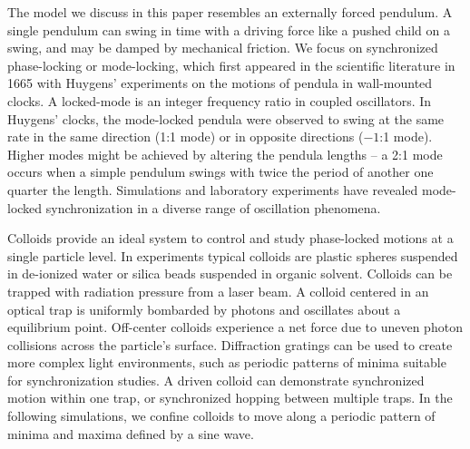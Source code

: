 \documentclass[preprint,showpacs,preprintnumbers,amsmath,amssymb,aps,prb]{revtex4-1}
\theoremstyle{remark}
\begin{document}
The model we discuss
in this paper 
resembles an externally forced pendulum.
A single pendulum 
can swing in time with a %
driving force
like  %
a pushed child on a swing,
and may be damped
by mechanical friction.
We focus on 
synchronized phase-locking or mode-locking,
which 
first appeared in the scientific literature
in 1665 with 
Huygens'  experiments on the
motions of %
pendula in wall-mounted clocks.\cite{Bennett2002}
A locked-mode is an integer frequency ratio
in coupled oscillators. %
In Huygens' clocks,
the mode-locked pendula were observed to swing at the same rate
in the same direction (1:1 mode) or in
opposite directions ($-1$:1 mode).
Higher modes might be achieved
by altering the pendula lengths --
a 2:1 mode occurs when a simple pendulum
swings with twice the period
of another one quarter the length.
Simulations and laboratory experiments
have revealed 
mode-locked synchronization
in a diverse range of 
oscillation phenomena.


Colloids 
provide an ideal system to 
control and study
phase-locked motions
at a single particle level.\cite{Juniper2015,Juniper2017}
In experiments %
typical colloids are   
plastic spheres suspended in
de-ionized water or silica beads suspended in organic solvent.
Colloids can be trapped
with 
radiation pressure from 
a laser beam.\cite{Ashkin1997} 
A colloid centered in an optical trap is 
uniformly bombarded by photons
and oscillates
about a equilibrium point.
Off-center colloids 
experience a net force
due to uneven photon collisions across
the particle's surface.
Diffraction gratings can be used to create
more complex light environments, 
such as periodic patterns of minima
suitable for synchronization studies.\cite{Grier2003}  
A driven colloid
can demonstrate
synchronized
motion within one trap,
or synchronized hopping between multiple traps.
In the following simulations, we confine colloids  
to move along a periodic pattern of 
minima and maxima defined by a sine wave.
\end{document}
